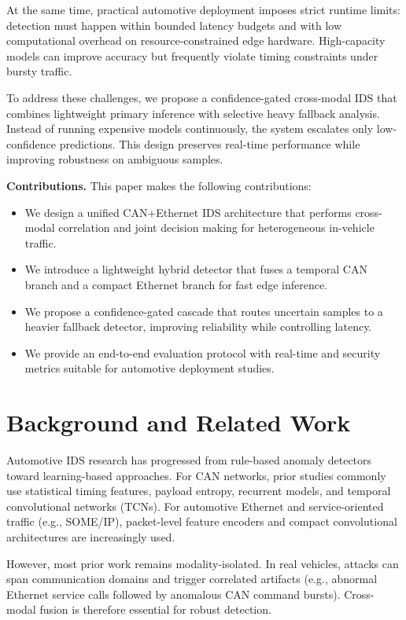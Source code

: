 \documentclass[conference]{IEEEtran}
\begin{document}
At the same time, practical automotive deployment imposes strict runtime limits: detection must happen within bounded latency budgets and with low computational overhead on resource-constrained edge hardware. High-capacity models can improve accuracy but frequently violate timing constraints under bursty traffic.

To address these challenges, we propose a confidence-gated cross-modal IDS that combines lightweight primary inference with selective heavy fallback analysis. Instead of running expensive models continuously, the system escalates only low-confidence predictions. This design preserves real-time performance while improving robustness on ambiguous samples.

\textbf{Contributions.} This paper makes the following contributions:
\begin{itemize}
    \item We design a unified CAN+Ethernet IDS architecture that performs cross-modal correlation and joint decision making for heterogeneous in-vehicle traffic.
    \item We introduce a lightweight hybrid detector that fuses a temporal CAN branch and a compact Ethernet branch for fast edge inference.
    \item We propose a confidence-gated cascade that routes uncertain samples to a heavier fallback detector, improving reliability while controlling latency.
    \item We provide an end-to-end evaluation protocol with real-time and security metrics suitable for automotive deployment studies.
\end{itemize}

\section{Background and Related Work}
Automotive IDS research has progressed from rule-based anomaly detectors toward learning-based approaches. For CAN networks, prior studies commonly use statistical timing features, payload entropy, recurrent models, and temporal convolutional networks (TCNs). For automotive Ethernet and service-oriented traffic (e.g., SOME/IP), packet-level feature encoders and compact convolutional architectures are increasingly used.

However, most prior work remains modality-isolated. In real vehicles, attacks can span communication domains and trigger correlated artifacts (e.g., abnormal Ethernet service calls followed by anomalous CAN command bursts). Cross-modal fusion is therefore essential for robust detection.
\end{document}
